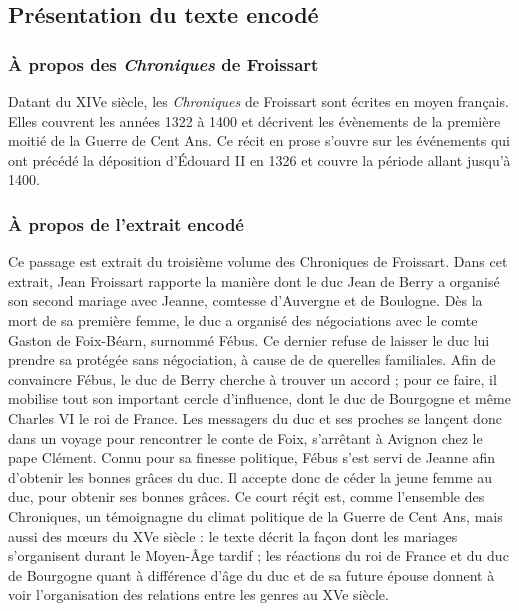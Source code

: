 \documentclass[12pt, a4paper]{article}
\begin{document}
	\subsection{Présentation du texte encodé}
	
	
	\subsubsection{À propos des \textit{Chroniques} de Froissart}
	Datant du XIVe siècle, les \textit{Chroniques} de Froissart sont écrites en moyen français. Elles couvrent les années 1322 à 1400 et décrivent les évènements de la première moitié de la Guerre de Cent Ans.
	Ce récit en prose s'ouvre sur les événements qui ont précédé la déposition d'Édouard II en 1326 et couvre la période allant jusqu'à 1400.\\ \indent 
	
	\subsubsection{À propos de l'extrait encodé}
	Ce passage est extrait du troisième volume des Chroniques de Froissart. Dans cet extrait, Jean Froissart rapporte la manière
	dont le duc Jean de Berry a organisé son second mariage avec Jeanne, comtesse d’Auvergne et de Boulogne.
	Dès la mort de sa première femme, le duc a organisé des négociations avec le comte Gaston de Foix-Béarn, surnommé Fébus. Ce dernier refuse de laisser
	le duc lui prendre sa protégée sans négociation, à cause de de querelles familiales. Afin de convaincre Fébus, le duc de Berry cherche à trouver
	un accord ; pour ce faire, il mobilise tout son important cercle d'influence, dont le duc de Bourgogne et même Charles VI le roi de France. Les messagers du duc et ses proches se lançent donc dans un voyage pour rencontrer le conte de Foix, s'arrêtant à Avignon chez le pape Clément. Connu pour
	sa finesse politique, Fébus s'est servi de Jeanne
	afin d'obtenir les bonnes grâces du duc. Il accepte donc de céder la jeune femme au duc, pour obtenir ses bonnes grâces. Ce court réçit est, comme l'ensemble des Chroniques, un témoignagne du climat politique de la Guerre de Cent Ans, mais aussi des mœurs du XVe siècle : le texte décrit 
	la façon dont les mariages s'organisent durant le Moyen-Âge tardif ; les réactions du roi de France et du duc de Bourgogne quant à différence d'âge du duc et de sa future
	épouse donnent à voir l'organisation des relations entre les genres au XVe siècle.
	
\end{document}
